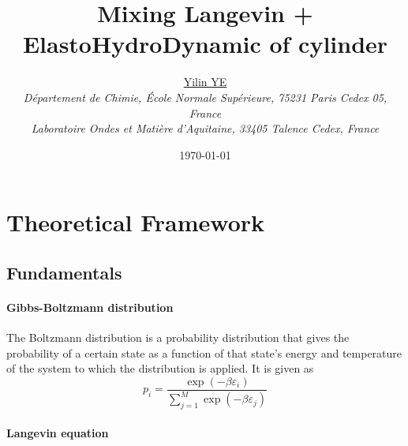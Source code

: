 \documentclass[books,12pt]{elegantpaper}
\title{\textcolor{ChimieBlue}{Mixing Langevin + ElastoHydroDynamic of cylinder}}
\author{\href{yilin.ye@ens.psl.eu}{{Yilin YE}}\\ \textit{\small{Département de Chimie, École Normale Supérieure, 75231 Paris Cedex 05, France}} \\ \textit{\small{Laboratoire Ondes et Matière d'Aquitaine, 33405 Talence Cedex, France}}}
\date{\today} %
\newcommand{\ssc}{\subsection}
\newcommand{\parag}{\paragraph}
\newcommand{\veps}{\varepsilon}
\begin{document}
\maketitle






\setcounter{page}{1} %



\section{Theoretical Framework}
\ssc{Fundamentals}
\parag{Gibbs-Boltzmann distribution} The Boltzmann distribution is a probability distribution that gives the probability of a certain state as a function of that state's energy and temperature of the system to which the distribution is applied. It is given as
$$ p_i = \frac{\exp(-\beta \veps_i)}{\sum_{j=1}^M \exp(-\beta \veps_j)} $$

\parag{Langevin equation} %
\end{document}
